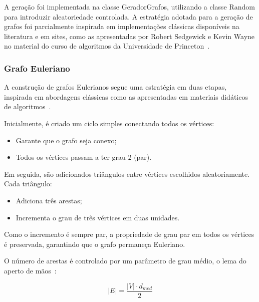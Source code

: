 \documentclass{sbc2023}%
\begin{document}
A geração foi implementada na classe GeradorGrafos, utilizando a classe Random para introduzir aleatoriedade controlada. A estratégia adotada para a geração de grafos foi parcialmente inspirada em implementações clássicas disponíveis na literatura e em sites, como as apresentadas por Robert Sedgewick e Kevin Wayne no material do curso de algoritmos da Universidade de Princeton~\citep{princeton_graph_gen}.

\subsubsection{Grafo Euleriano}

A construção de grafos Eulerianos segue uma estratégia em duas etapas, inspirada em abordagens clássicas como as apresentadas em materiais didáticos de algoritmos~\citep{princeton_graph_gen}.

\begin{description}[leftmargin=!, labelsep=0.2em]
    \item [Etapa 1 -- Ciclo Base:] Inicialmente, é criado um ciclo simples conectando todos os vértices:
    \begin{itemize}
        \item Garante que o grafo seja conexo;
        \item Todos os vértices passam a ter grau 2 (par).
    \end{itemize}

    \item[Etapa 2 -- Adição de Triângulos:] Em seguida, são adicionados triângulos entre vértices escolhidos aleatoriamente. Cada triângulo:
    \begin{itemize}
        \item Adiciona três arestas;
        \item Incrementa o grau de três vértices em duas unidades.
    \end{itemize}
\end{description}

Como o incremento é sempre par, a propriedade de grau par em todos os vértices é preservada, garantindo que o grafo permaneça Euleriano.
\begin{description}[leftmargin=!, labelsep=0.2em]
    \item[Controle de densidade:] O número de arestas é controlado por um parâmetro de grau médio, o lema do aperto de mãos~\cite{cormen2022introduction}:
\end{description}

\begin{equation}
    |E| = \frac{|V| \cdot d_{med}}{2}
\end{equation}
\end{document}
